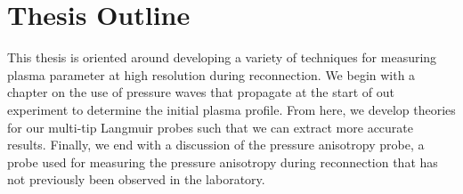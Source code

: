 \section{Thesis Outline}

This thesis is oriented around developing a variety of techniques for measuring plasma parameter at high resolution during reconnection. We begin with a chapter on the use of pressure waves that propagate at the start of out experiment to determine the initial plasma profile. From here, we develop theories for our multi-tip Langmuir probes such that we can extract more accurate results. Finally, we end with a discussion of the pressure anisotropy probe, a probe used for measuring the pressure anisotropy during reconnection that has not previously been observed in the laboratory.
